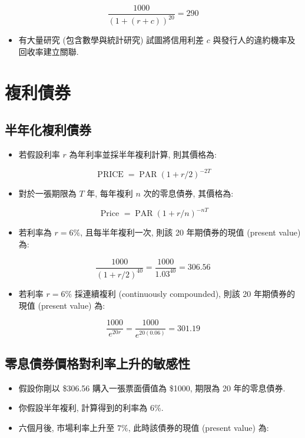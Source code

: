 \documentclass[letterpaper]{article}
\begin{document}
		
		$$
		\frac{1000}{ (1+ (r+c) ) ^{20}}=290
		$$
		
		\begin{itemize}
			\item 有大量研究 (包含數學與統計研究) 試圖將信用利差 \(c\) 與發行人的違約機率及回收率建立關聯.  
		\end{itemize}
		
		\section{複利債券}
		\subsection{半年化複利債券}
		\begin{itemize}
			\item 若假設利率 \( r \) 為年利率並採半年複利計算, 則其價格為: 
		\end{itemize}
		
		$$
		\operatorname{PRICE}=\operatorname{PAR} (1+r / 2) ^{-2 T}
		$$
		
		\begin{itemize}
			\item 對於一張期限為 \( T \) 年, 每年複利 \( n \) 次的零息債券, 其價格為: 
		\end{itemize}
		
		$$
		\text { Price }=\operatorname{PAR} (1+r / n) ^{-n T}
		$$
		
		\begin{itemize}
			\item 若利率為 \( r = 6\% \), 且每半年複利一次, 則該 20 年期債券的現值 (present value) 為: 
		\end{itemize}
		
		
		$$
		\frac{1000}{ (1+r / 2) ^{40}}=\frac{1000}{1.03^{40}}=306.56
		$$
		
		
		\begin{itemize}
			\item 若利率 \( r = 6\% \) 採連續複利 (continuously compounded), 則該 20 年期債券的現值 (present value) 為: 
		\end{itemize}
		
		$$
		\frac{1000}{e^{20 r}}=\frac{1000}{e^{20 (0.06) }}=301.19
		$$
		
		\subsection{零息債券價格對利率上升的敏感性}
		\begin{itemize}
			\item 假設你剛以 \$306.56 購入一張票面價值為 \$1000, 期限為 20 年的零息債券.  
			\item 你假設半年複利, 計算得到的利率為 \(6\%\).  
			\item 六個月後, 市場利率上升至 \(7\%\), 此時該債券的現值 (present value) 為: 
		\end{itemize}
		
\end{document}
